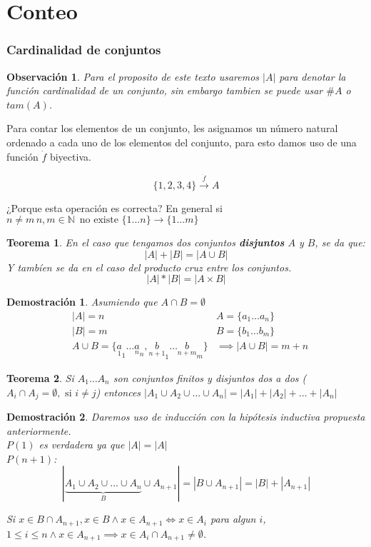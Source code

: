 \documentclass[9pt,a4paper,draft]{article}
\theoremstyle{definition}
\theoremstyle{plain}
\newtheorem{teo}{Teorema}
\newtheorem{demo}{Demostración}[teo]
\newtheorem{obs}{Observación}
\begin{document}
\part{Conteo}

\section{Cardinalidad de conjuntos}

\begin{obs}
Para el proposito de este texto usaremos $|A|$ para denotar la función {\itshape cardinalidad} de un conjunto, sin embargo tambien se puede usar $\#A$ o $tam(A)$.
\end{obs}

Para contar los elementos de un conjunto, les asignamos un número natural ordenado a cada uno de los elementos del conjunto, para esto damos uso de una función $\dot{f}$ biyectiva.

$$\{1,2,3,4\}\xrightarrow{\dot{f}}A$$

¿Porque esta operación es correcta? En general si $n\neq{m}\, n,m\in{\mathbb{N}}\, \text{ no existe }\{1\dots n\}\to\{1\dots m\}$\\

\begin{teo}
En el caso que tengamos dos conjuntos {\bfseries disjuntos} $A$ y $B$, se da que:\\
$$|A|+|B|=|A\cup B|$$
Y tambíen se da en el caso del producto cruz entre los conjuntos.\\
$$|A|*|B|=|A\times{B}|$$
\end{teo}

\begin{demo} Asumiendo que $A\cap{B}=\emptyset$
\begin{align*}
& |A| = n & A=\{a_1 \dots a_n\}\\
& |B| = m & B=\{b_1 \dots b_m\}\\
& A\cup{B}=\{\underset{1}a_1\dots \underset{n}a_n, \underset{n+1}b_1 \dots \underset{n+m}b_m\} & \implies |A\cup{B}|=m+n
\end{align*}
\end{demo}

\begin{teo} Si $A_1 \dots A_n$ son conjuntos finitos y disjuntos dos a dos ($A_i\cap A_j = \emptyset,\text{ si }i\neq{j}$) entonces $|A_1\cup{A_2}\cup{\dots}\cup{A_n}| = |A_1|+|A_2|+\dots+|A_n|$\end{teo}

\begin{demo}
Daremos uso de inducción con la hipótesis inductiva propuesta anteriormente.\\
$P(1)$ es verdadera ya que $|A| = |A|$\\
$P(n+1)$:\\
$$|\underbrace{A_1\cup{A_2}\cup{\dots}\cup{A_n}}_{B}\cup{A_{n+1}}|=|B\cup{A_{n+1}}|=|B|+|A_{n+1}|$$

Si $x\in{B\cap{A_{n+1}}}, x\in{B}\land x\in{A_{n+1}}\iff x\in{A_i}$ para algun $i$, $1\leq{i}\leq{n} \land x\in{A_{n+1}} \implies x\in A_i \cap A_{n+1} \neq \emptyset$.
\end{demo}
\end{document}
